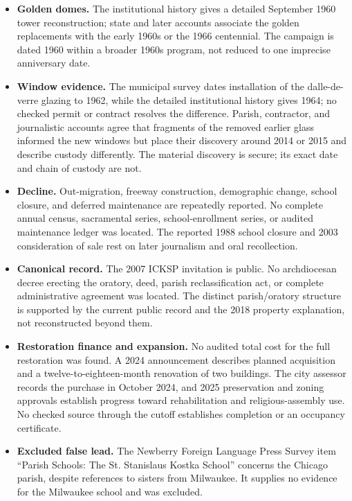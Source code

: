 \begin{itemize}[leftmargin=1.45em,itemsep=0.25em,topsep=0.25em]
\item \textbf{Golden domes.} The institutional history gives a detailed September 1960 tower reconstruction; state and later accounts associate the golden replacements with the early 1960s or the 1966 centennial. The campaign is dated 1960 within a broader 1960s program, not reduced to one imprecise anniversary date.
\item \textbf{Window evidence.} The municipal survey dates installation of the dalle-de-verre glazing to 1962, while the detailed institutional history gives 1964; no checked permit or contract resolves the difference. Parish, contractor, and journalistic accounts agree that fragments of the removed earlier glass informed the new windows but place their discovery around 2014 or 2015 and describe custody differently. The material discovery is secure; its exact date and chain of custody are not.
\item \textbf{Decline.} Out-migration, freeway construction, demographic change, school closure, and deferred maintenance are repeatedly reported. No complete annual census, sacramental series, school-enrollment series, or audited maintenance ledger was located. The reported 1988 school closure and 2003 consideration of sale rest on later journalism and oral recollection.
\item \textbf{Canonical record.} The 2007 ICKSP invitation is public. No archdiocesan decree erecting the oratory, deed, parish reclassification act, or complete administrative agreement was located. The distinct parish/oratory structure is supported by the current public record and the 2018 property explanation, not reconstructed beyond them.
\item \textbf{Restoration finance and expansion.} No audited total cost for the full restoration was found. A 2024 announcement describes planned acquisition and a twelve-to-eighteen-month renovation of two buildings. The city assessor records the purchase in October 2024, and 2025 preservation and zoning approvals establish progress toward rehabilitation and religious-assembly use. No checked source through the cutoff establishes completion or an occupancy certificate.
\item \textbf{Excluded false lead.} The Newberry Foreign Language Press Survey item ``Parish Schools: The St. Stanislaus Kostka School'' concerns the Chicago parish, despite references to sisters from Milwaukee. It supplies no evidence for the Milwaukee school and was excluded.
\end{itemize}


